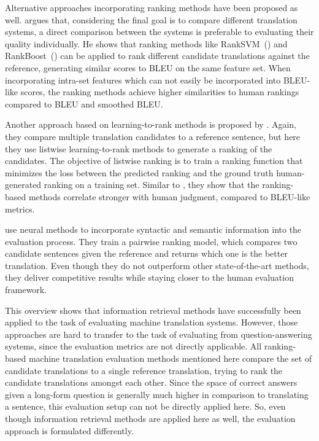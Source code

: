 Alternative approaches incorporating ranking methods have been proposed as well.
\cite{duh:2008:Ranking} argues that, considering the final goal is to compare different translation systems, a direct comparison between the systems is preferable to evaluating their quality individually.
He shows that ranking methods like RankSVM~(\cite{joachims:2002:Optimizing}) and RankBoost~(\cite{freund:2003:An}) can be applied to rank different candidate translations against the reference, generating similar scores to BLEU on the same feature set.
When incorporating intra-set features which can not easily be incorporated into BLEU-like scores, the ranking methods achieve higher similarities to human rankings compared to BLEU and smoothed BLEU.

Another approach based on learning-to-rank methods is proposed by \cite{li:2013:Listwise}.
Again, they compare multiple translation candidates to a reference sentence, but here they use listwise learning-to-rank methods to generate a ranking of the candidates.
The objective of listwise ranking is to train a ranking function that minimizes the loss between the predicted ranking and the ground truth human-generated ranking on a training set.
Similar to \cite{duh:2008:Ranking}, they show that the ranking-based methods correlate stronger with human judgment, compared to BLEU-like metrics.

\cite{guzman:2019:Pairwise} use neural methods to incorporate syntactic and semantic information into the evaluation process.
They train a pairwise ranking model, which compares two candidate sentences given the reference and returns which one is the better translation.
Even though they do not outperform other state-of-the-art methods, they deliver competitive results while staying closer to the human evaluation framework.


This overview shows that information retrieval methods have successfully been applied to the task of evaluating machine translation systems.
However, those approaches are hard to transfer to the task of evaluating from question-answering systems, since the evaluation metrics are not directly applicable.
All ranking-based machine translation evaluation methods mentioned here compare the set of candidate translations to a single reference translation, trying to rank the candidate translations amongst each other.
Since the space of correct answers given a long-form question is generally much higher in comparison to translating a sentence, this evaluation setup can not be directly applied here.
So, even though information retrieval methods are applied here as well, the evaluation approach is formulated differently.


